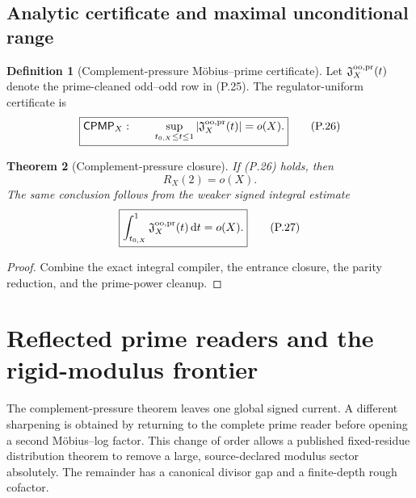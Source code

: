 \documentclass[11pt]{article}
\newtheorem{theorem}{Theorem}[section]
\theoremstyle{definition}
\newtheorem{definition}[theorem]{Definition}
\theoremstyle{remark}
\newcommand{\dd}{\mathrm d}
\begin{document}
\subsection{Analytic certificate and maximal unconditional range}
\label{subsec:affpress-certificate}

\begin{definition}[Complement-pressure M\"obius--prime certificate]
\label{def:affpress-CPMP-certificate}
Let $\mathfrak J_X^{\rm oo,pr}(t)$ denote the prime-cleaned odd--odd row in
\textup{(P.25)}.  The regulator-uniform certificate is
\begin{equation}
 \label{eq:affpress-CPMP-certificate}
 \boxed{
 \mathsf{CPMP}_X:\qquad
 \sup_{t_{0,X}\le t\le1}
 \left|\mathfrak J_X^{\rm oo,pr}(t)\right|
 =o(X).}
 \tag{P.26}
\end{equation}
\end{definition}

\begin{theorem}[Complement-pressure closure]
\label{thm:affpress-CPMP-closure}
If \textup{(P.26)} holds, then
\[
 \boxed{R_X(2)=o(X).}
\]
The same conclusion follows from the weaker signed integral estimate
\begin{equation}
 \label{eq:affpress-integrated-certificate}
 \boxed{
 \int_{t_{0,X}}^1
 \mathfrak J_X^{\rm oo,pr}(t)\,\dd t=o(X).}
 \tag{P.27}
\end{equation}
\end{theorem}

\begin{proof}
Combine the exact integral compiler, the entrance closure, the parity
reduction, and the prime-power cleanup.
\end{proof}



\section{Reflected prime readers and the rigid-modulus frontier}
\label{sec:affine-hard-modulus}

The complement-pressure theorem leaves one global signed current.  A
different sharpening is obtained by returning to the complete prime reader
before opening a second M\"obius--log factor.  This change of order allows a
published fixed-residue distribution theorem to remove a large,
source-declared modulus sector absolutely.  The remainder has a canonical
divisor gap and a finite-depth rough cofactor.
\end{document}

